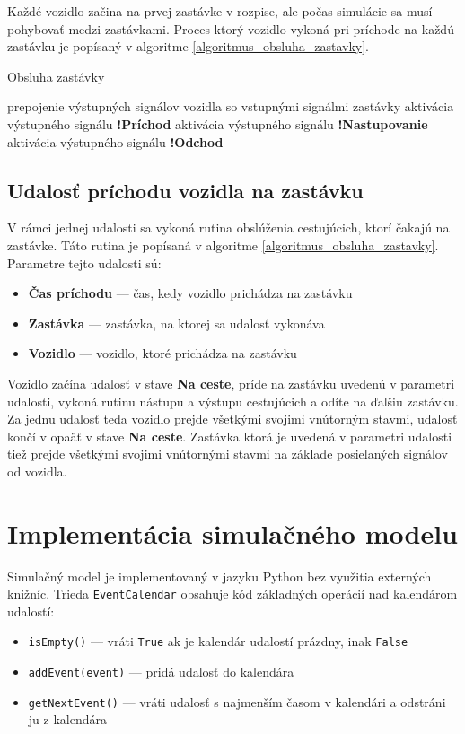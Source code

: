 Každé vozidlo začina na prvej zastávke v rozpise, ale počas simulácie sa musí pohybovať medzi zastávkami.
Proces ktorý vozidlo vykoná pri príchode na každú zastávku je popísaný v algoritme \ref{algoritmus_obsluha_zastavky}.

\vspace*{\dimexpr 0.5\baselineskip\relax}
\begin{algorithm}[H]
\label{algoritmus_obsluha_zastavky}
\caption{Obsluha zastávky}
\begin{algorithmic}[1]
  \STATE prepojenie výstupných signálov vozidla so vstupnými signálmi zastávky
  \STATE aktivácia výstupného signálu \textbf{!Príchod}
  \STATE aktivácia výstupného signálu \textbf{!Nastupovanie}
  \STATE aktivácia výstupného signálu \textbf{!Odchod}
\end{algorithmic}
\end{algorithm}

\subsection*{Udalosť príchodu vozidla na zastávku}

V rámci jednej udalosti sa vykoná rutina obslúženia cestujúcich, ktorí čakajú na zastávke. Táto rutina je popísaná v algoritme \ref{algoritmus_obsluha_zastavky}.
Parametre tejto udalosti sú:
\begin{itemize}
  \item \textbf{Čas príchodu} --- čas, kedy vozidlo prichádza na zastávku
  \item \textbf{Zastávka} --- zastávka, na ktorej sa udalosť vykonáva
  \item \textbf{Vozidlo} --- vozidlo, ktoré prichádza na zastávku
\end{itemize}

Vozidlo začína udalosť v stave \textbf{Na ceste}, príde na zastávku uvedenú v parametri udalosti, vykoná rutinu nástupu a výstupu cestujúcich a odíte na ďalšiu zastávku.
Za jednu udalosť teda vozidlo prejde všetkými svojimi vnútorným stavmi, udalosť končí v opaäť v stave \textbf{Na ceste}.
Zastávka ktorá je uvedená v parametri udalosti tiež prejde všetkými svojimi vnútornými stavmi na základe posielaných signálov od vozidla.

\section{Implementácia simulačného modelu}

Simulačný model je implementovaný v jazyku Python bez využitia externých knižníc.
Trieda \texttt{EventCalendar} obsahuje kód základných operácií nad kalendárom udalostí:
\begin{itemize}
  \item \texttt{isEmpty()} --- vráti \texttt{True} ak je kalendár udalostí prázdny, inak \texttt{False}
  \item \texttt{addEvent(event)} --- pridá udalosť do kalendára
  \item \texttt{getNextEvent()} --- vráti udalosť s najmenším časom v kalendári a odstráni ju z kalendára
\end{itemize}

